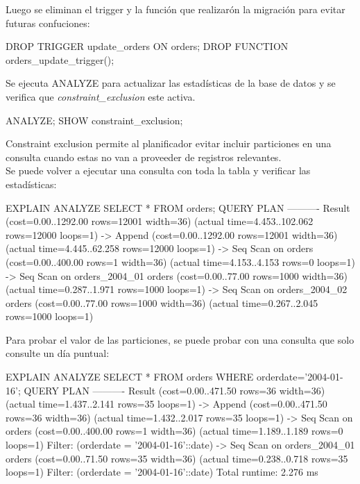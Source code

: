 Luego se eliminan el trigger y la función que realizarón la migración para evitar futuras confuciones:\\

\begin{pyglist}
DROP TRIGGER update_orders ON orders;
DROP FUNCTION orders_update_trigger();
\end{pyglist}

Se ejecuta ANALYZE para actualizar las estadísticas de la base de datos y se verifica que \textit{constraint\_exclusion} este activa.\\

\begin{pyglist}
ANALYZE;
SHOW constraint_exclusion;
\end{pyglist}

Constraint exclusion permite al planificador evitar incluir particiones en una consulta cuando estas no van a proveeder de registros relevantes. \\

Se puede volver a ejecutar una consulta con toda la tabla y verificar las estadísticas:\\

\begin{pyglist}
EXPLAIN ANALYZE SELECT * FROM orders;
QUERY PLAN
----------
Result (cost=0.00..1292.00 rows=12001 width=36) (actual
time=4.453..102.062 rows=12000 loops=1)
-> Append (cost=0.00..1292.00 rows=12001 width=36) (actual
time=4.445..62.258 rows=12000 loops=1)
      -> Seq Scan on orders (cost=0.00..400.00 rows=1 width=36)
(actual time=4.153..4.153 rows=0 loops=1)
      -> Seq Scan on orders_2004_01 orders (cost=0.00..77.00
rows=1000 width=36) (actual time=0.287..1.971 rows=1000 loops=1)
      -> Seq Scan on orders_2004_02 orders (cost=0.00..77.00
rows=1000 width=36) (actual time=0.267..2.045 rows=1000 loops=1)
\end{pyglist}

Para probar el valor de las particiones, se puede probar con una consulta que solo consulte un día puntual:\\

\begin{pyglist}
EXPLAIN ANALYZE SELECT * FROM orders WHERE orderdate='2004-01-16';
QUERY PLAN
----------
Result (cost=0.00..471.50 rows=36 width=36) (actual time=1.437..2.141
rows=35 loops=1)
   -> Append (cost=0.00..471.50 rows=36 width=36) (actual
time=1.432..2.017 rows=35 loops=1)
      -> Seq Scan on orders (cost=0.00..400.00 rows=1 width=36)
(actual time=1.189..1.189 rows=0 loops=1)
          Filter: (orderdate = '2004-01-16'::date)
     -> Seq Scan on orders_2004_01 orders (cost=0.00..71.50 rows=35
width=36) (actual time=0.238..0.718 rows=35 loops=1)
          Filter: (orderdate = '2004-01-16'::date)
Total runtime: 2.276 ms
\end{pyglist}

